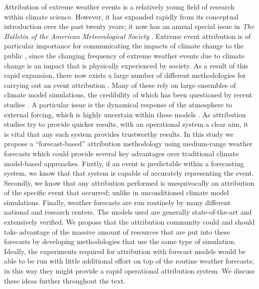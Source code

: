   Attribution of extreme weather events is a relatively young field of research within climate science. However, it has expanded rapidly from its conceptual introduction \citep{allen_liability_2003} over the past twenty years; it now has an annual special issue in \emph{The Bulletin of the American Meteorological Society} \citep{peterson_explaining_2012}. Extreme event attribution is of particular importance for communicating the impacts of climate change to the public \citep{hulme_attributing_2014,hassol_natural_2016}, since the changing frequency of extreme weather events due to climate change is an impact that is physically experienced by society. As a result of this rapid expansion, there now exists a large number of different methodologies for carrying out an event attribution \citep{herring_explaining_2021}. Many of these rely on large ensembles of climate model simulations, the credibility of which has been questioned by recent studies \citep{bellprat_attribution_2016,bellprat_towards_2019,palmer_simple_2018}. A particular issue is the dynamical response of the atmosphere to external forcing, which is highly uncertain within these models \citep{shepherd_common_2016}. As attribution studies try to provide quicker results, with an operational system a clear aim, it is vital that any such system provides trustworthy results. In this study we propose a “forecast-based” attribution methodology using medium-range weather forecasts which could provide several key advantages over traditional climate model-based approaches. Firstly, if an event is predictable within a forecasting system, we know that that system is capable of accurately representing the event. Secondly, we know that any attribution performed is unequivocally an attribution of the specific event that occurred; unlike in unconditioned climate model simulations. Finally, weather forecasts are run routinely by many different national and research centers. The models used are generally state-of-the-art and extensively verified. We propose that the attribution community could and should take advantage of the massive amount of resources that are put into these forecasts by developing methodologies that use the same type of simulation. Ideally, the experiments required for attribution with forecast models would be able to be run with little additional effort on top of the routine weather forecasts; in this way they might provide a rapid operational attribution system. We discuss these ideas further throughout the text.

